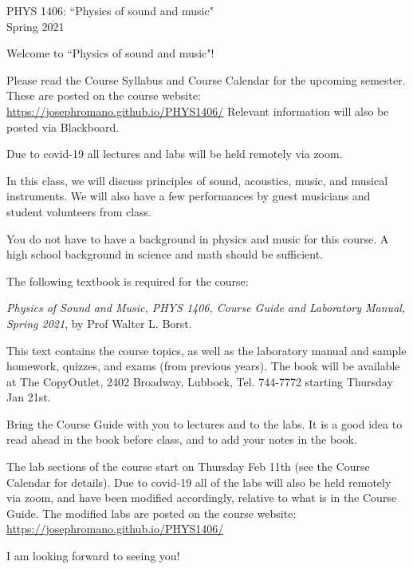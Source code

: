 \documentclass[11pt]{NSF}
\begin{document}
\begin{center}
PHYS 1406: ``Physics of sound and music"\\
Spring 2021
\end{center}

Welcome to ``Physics of sound and music"!

Please read the Course Syllabus and Course Calendar for the upcoming semester. 
These are posted on the course website:
\url{https://josephromano.github.io/PHYS1406/}
Relevant information will also be posted via Blackboard.

Due to covid-19 all lectures and labs will be held remotely via zoom.

In this class, we will discuss principles of sound, acoustics, music,
and musical instruments.  We will also have a few performances by
guest musicians %
and student volunteers from class. 

You do not have to have a background in physics and music for this
course. A high school background in science and math should be
sufficient.

The following textbook is required for the course:

{\em Physics of Sound and Music, PHYS 1406,
Course Guide and Laboratory Manual, Spring 2021}, by Prof Walter L. Borst.

This text contains the course topics, as well as the laboratory manual 
and sample homework, quizzes, and exams (from previous years).
The book will be available at The CopyOutlet, 2402 Broadway, Lubbock, 
Tel. 744-7772 starting Thursday Jan 21st.

Bring the Course Guide with you to lectures and to the labs.  
It is a good idea to read ahead in the book before
class, and to add your notes in the book.


The lab sections of the course start on Thursday Feb 11th
(see the Course Calendar for details).
Due to covid-19 all of the labs will also be held remotely via zoom,
and have been modified accordingly, relative to what is in the Course Guide.
The modified labs are posted on the course website:
\url{https://josephromano.github.io/PHYS1406/}

I am looking forward to seeing you!
\end{document}
